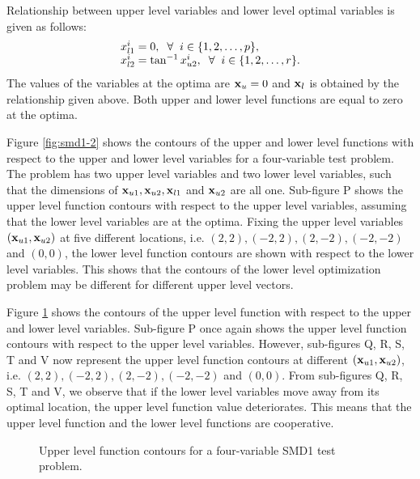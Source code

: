 \documentclass[twoside]{article}
\begin{document}
Relationship between upper level variables and lower level optimal variables is given as follows:
\begin{equation}
\begin{array}{l}
x_{l1}^{i} = 0, \hspace{2mm} \forall \hspace{2mm} i \in \{1,2,\ldots,p\},\\
x_{l2}^{i} = \tan^{-1} x_{u2}^{i}, \hspace{2mm} \forall \hspace{2mm} i \in \{1,2,\ldots,r\}.
\end{array}
\end{equation}
The values of the variables at the optima are $\mbox{$\mathbf{x}$}_u=0$ and $\mbox{$\mathbf{x}$}_l$ is obtained by the relationship given above. Both upper and lower level functions are equal to zero at the optima.

Figure \ref{fig:smd1-2} shows the contours of the upper and lower level functions with respect to the upper and lower level variables for a four-variable test problem. The problem has two upper level variables and two lower level variables, such that the dimensions of $\mbox{$\mathbf{x}$}_{u1}, \mbox{$\mathbf{x}$}_{u2}, \mbox{$\mathbf{x}$}_{l1}$ and $\mbox{$\mathbf{x}$}_{u2}$ are all one. Sub-figure P shows the upper level function contours with respect to the upper level variables, assuming that the lower level variables are at the optima. Fixing the upper level variables $(\mbox{$\mathbf{x}$}_{u1},\mbox{$\mathbf{x}$}_{u2})$ at five different locations, i.e. $(2,2), (-2,2), (2,-2), (-2,-2)$ and $(0,0)$, the lower level function contours are shown with respect to the lower level variables. This shows that the contours of the lower level optimization problem may be different for different upper level vectors.

Figure \ref{fig:smd1} shows the contours of the upper level function with respect to the upper and lower level variables. Sub-figure P once again shows the upper level function contours with respect to the upper level variables. However, sub-figures Q, R, S, T and V now represent the upper level function contours at different $(\mbox{$\mathbf{x}$}_{u1},\mbox{$\mathbf{x}$}_{u2})$, i.e. $(2,2), (-2,2), (2,-2), (-2,-2)$ and $(0,0)$. From sub-figures Q, R, S, T and V, we observe that if the lower level variables move away from its optimal location, the upper level function value deteriorates. This means that the upper level function and the lower level functions are cooperative.

\begin{figure}
\begin{center}
\caption{Upper level function contours for a four-variable SMD1 test problem.}
\label{fig:smd1}
\end{center}
\end{figure}
\end{document}
